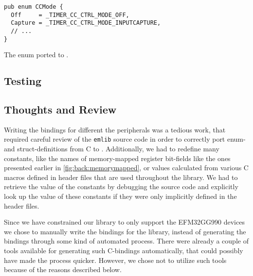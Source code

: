 \begin{listing}[h]
\begin{verbatim}
pub enum CCMode {
  Off     = _TIMER_CC_CTRL_MODE_OFF,
  Capture = _TIMER_CC_CTRL_MODE_INPUTCAPTURE,
  // ...
}
\end{verbatim}
\caption{The enum ported to \rust.}
\label{lst:enum_naming_rust}
\end{listing}

\subsection{Testing}
\label{ssub:testing}


\subsection{Thoughts and Review}


Writing the bindings for different the peripherals was a tedious work, that required careful review of the \texttt{emlib} source code in order to correctly port enum- and struct-definitions from C to \rust.
Additionally, we had to redefine many constants, like the names of memory-mapped register bit-fields like the ones presented earlier in \autoref{fig:back:memorymapped}, or values calculated from various C macros defined in header files that are used throughout the library.
We had to retrieve the value of the constants by debugging the source code and explicitly look up the value of these constants if they were only implicitly defined in the header files.

Since we have constrained our library to only support the EFM32GG990 devices we chose to manually write the bindings for the library, instead of generating the bindings through some kind of automated process.
There were already a couple of tools available for generating such C-bindings automatically, that could possibly have made the process quicker.
However, we chose not to utilize such tools because of the reasons described below.

